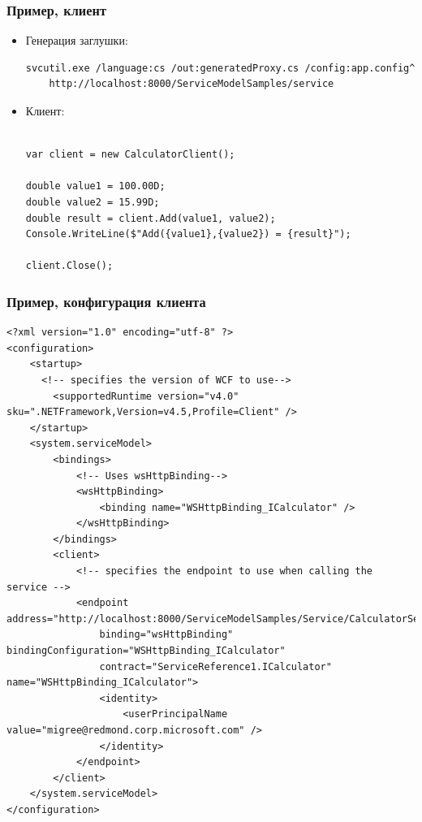\documentclass{../../slides-style}
\begin{document}
    \begin{frame}[fragile]
        \frametitle{Пример, клиент}
        \begin{itemize}
            \item Генерация заглушки: 
                \begin{scriptsize}
                    \begin{verbatim}
svcutil.exe /language:cs /out:generatedProxy.cs /config:app.config^
    http://localhost:8000/ServiceModelSamples/service
                    \end{verbatim}
                \end{scriptsize}
            \item Клиент:
                \begin{footnotesize}
                    \begin{verbatim}

var client = new CalculatorClient();

double value1 = 100.00D;
double value2 = 15.99D;
double result = client.Add(value1, value2);
Console.WriteLine($"Add({value1},{value2}) = {result}");

client.Close();
                    \end{verbatim}
                \end{footnotesize}
        \end{itemize}
    \end{frame}

    \begin{frame}[fragile]
        \frametitle{Пример, конфигурация клиента}
        \begin{ssmall}
            \begin{verbatim}
<?xml version="1.0" encoding="utf-8" ?>  
<configuration>  
    <startup>   
      <!-- specifies the version of WCF to use-->  
        <supportedRuntime version="v4.0" sku=".NETFramework,Version=v4.5,Profile=Client" />  
    </startup>  
    <system.serviceModel>  
        <bindings>  
            <!-- Uses wsHttpBinding-->  
            <wsHttpBinding>  
                <binding name="WSHttpBinding_ICalculator" />  
            </wsHttpBinding>  
        </bindings>  
        <client>  
            <!-- specifies the endpoint to use when calling the service -->  
            <endpoint address="http://localhost:8000/ServiceModelSamples/Service/CalculatorService"  
                binding="wsHttpBinding" bindingConfiguration="WSHttpBinding_ICalculator"  
                contract="ServiceReference1.ICalculator" name="WSHttpBinding_ICalculator">  
                <identity>  
                    <userPrincipalName value="migree@redmond.corp.microsoft.com" />  
                </identity>  
            </endpoint>  
        </client>  
    </system.serviceModel>  
</configuration>
            \end{verbatim}
        \end{ssmall}
    \end{frame}
\end{document}
